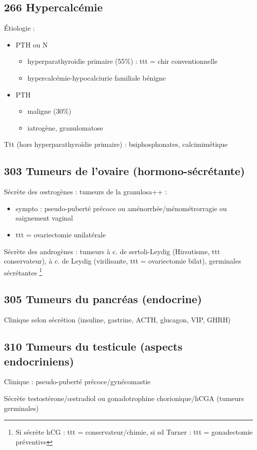 \documentclass[11pt]{article}
\begin{document}
\subsection{266 Hypercalcémie}
\label{sec:orgebb4461}
Étiologie :
\begin{itemize}
\item PTH \inc ou N
\begin{itemize}
\item hyperparathyroïdie primaire (55\%) : ttt = chir conventionnelle
\item hypercalcémie-hypocalciurie familiale bénigne
\end{itemize}
\item PTH \dec
\begin{itemize}
\item maligne (30\%)
\item iatrogène, granulomatose
\end{itemize}
\end{itemize}
Ttt (hors hyperparathyroïdie primaire) : bsiphosphonates, calcimimétique
\subsection{303 Tumeurs de l'ovaire (hormono-sécrétante)}
\label{sec:org40c35fb}
Sécrète des \oe{}strogènes : tumeurs de la granulosa++ : 
\begin{itemize}
\item sympto : pseudo-puberté précoce ou aménorrhée/ménométrorragie ou saignement vaginal
\item ttt = ovariectomie unilatérale
\end{itemize}
Sécrète des androgènes : tumeurs à c. de sertoli-Leydig (Hirsutisme, ttt
conservateur), à c. de Leydig (virilisante, ttt = ovariectomie bilat),
germinales sécrétantes \footnote{Si sécrète hCG : ttt = conservateur/chimie, si sd
Turner : ttt = gonadectomie préventive}
\subsection{305 Tumeurs du pancréas (endocrine)}
\label{sec:orgf00325b}
Clinique selon sécrétion (insuline, gastrine, ACTH, glucagon, VIP, GHRH)
\subsection{310 Tumeurs du testicule (aspects endocriniens)}
\label{sec:org352e4fe}
Clinique : pseudo-puberté précoce/gynécomastie

Sécrète testostérone/\oe{}stradiol ou gonadotrophine chorionique/hCGA (tumeurs
germinales)
\end{document}
